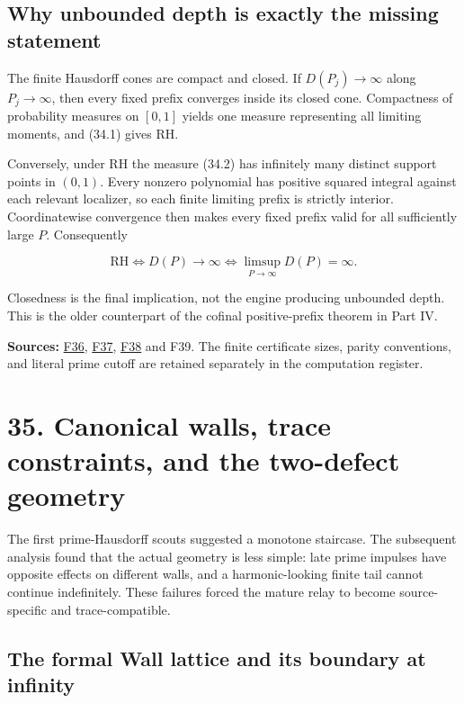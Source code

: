 \documentclass[
  10pt,
  a4paper,
  10pt,
  oneside,
  openany]{book}
\begin{document}
\subsection{Why unbounded depth is exactly the missing
statement}\label{why-unbounded-depth-is-exactly-the-missing-statement}

The finite Hausdorff cones are compact and closed. If
\(D(P_j)\to\infty\) along \(P_j\to\infty\), then every fixed prefix
converges inside its closed cone. Compactness of probability measures on
\([0,1]\) yields one measure representing all limiting moments, and
(34.1) gives RH.

Conversely, under RH the measure (34.2) has infinitely many distinct
support points in \((0,1)\). Every nonzero polynomial has positive
squared integral against each relevant localizer, so each finite
limiting prefix is strictly interior. Coordinatewise convergence then
makes every fixed prefix valid for all sufficiently large \(P\).
Consequently

\[
 \boxed{\mathrm{RH}\iff D(P)\to\infty
 \iff\limsup_{P\to\infty}D(P)=\infty.}
 \tag{34.6}\label{eq:34.6}
\]

Closedness is the final implication, not the engine producing unbounded
depth. This is the older counterpart of the cofinal positive-prefix
theorem in Part IV.

\textbf{Sources:} \hyperref[source-f36]{F36},
\hyperref[source-f37]{F37}, \hyperref[source-f38]{F38} and F39. The
finite certificate sizes, parity conventions, and literal prime cutoff
are retained separately in the computation register.

\section{35. Canonical walls, trace constraints, and the two-defect
geometry}\label{ch-walls}

The first prime-Hausdorff scouts suggested a monotone staircase. The
subsequent analysis found that the actual geometry is less simple: late
prime impulses have opposite effects on different walls, and a
harmonic-looking finite tail cannot continue indefinitely. These
failures forced the mature relay to become source-specific and
trace-compatible.

\subsection{The formal Wall lattice and its boundary at
infinity}\label{the-formal-wall-lattice-and-its-boundary-at-infinity}
\end{document}
